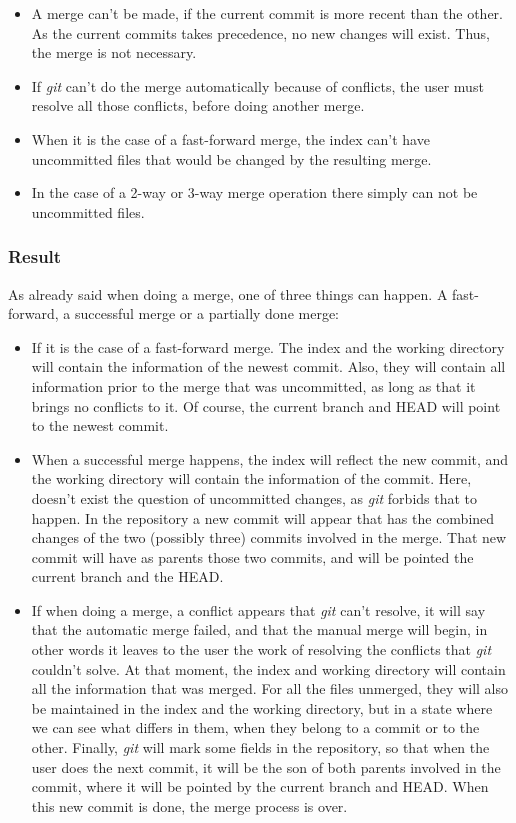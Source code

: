 \begin{itemize}
\item A merge can't be made, if the current commit is more recent than the
other. As the current commits takes precedence, no new changes will exist. 
Thus, the merge is not necessary.
\item If \emph{git} can't do the merge automatically because of conflicts,
the user must resolve all those conflicts, before doing another merge.

\item When it is the case of a fast-forward merge, the index can't have 
uncommitted files that would be changed by the resulting merge.

\item In the case of a 2-way or 3-way merge operation there simply 
can not be uncommitted files.
\end{itemize}

\subsubsection{Result}
As already said when doing a merge, one of three things can happen. A 
fast-forward, a successful merge or a partially done merge:

\begin{itemize}
\item If it is the case of a fast-forward merge. The index and the working directory
will contain the information of the newest commit. Also, they will contain all 
information prior to the merge that was uncommitted, as long as that it brings
no conflicts to it. Of course, the current branch and HEAD will point to the
newest commit.

\item When a successful merge happens, the index will reflect the new commit,
and the working directory will contain the information of the commit. Here,
doesn't exist the question of uncommitted changes, as \emph{git} forbids that
to happen. In the repository a new commit will appear that has the combined
changes of the two (possibly three) commits involved in the merge. That new
commit will have as parents those two commits, and will be pointed the current
branch and the HEAD.

\item If when doing a merge, a conflict appears that \emph{git} can't resolve,
it will say that the automatic merge failed, and that the manual merge will
begin, in other words it leaves to the user the work of resolving the conflicts
that \emph{git} couldn't solve. At that moment, the index and working directory
will contain all the information that was merged. For all the files unmerged, they
will also be maintained in the index and the working directory, but in a
state where we can see what differs in them, when they belong to a commit or to
the other. Finally, \emph{git} will mark some fields in the repository, so that
when the user does the next commit, it will be the son of both parents
involved in the commit, where it will be pointed by the current branch and HEAD.
When this new commit is done, the merge process is over.

\end{itemize}

